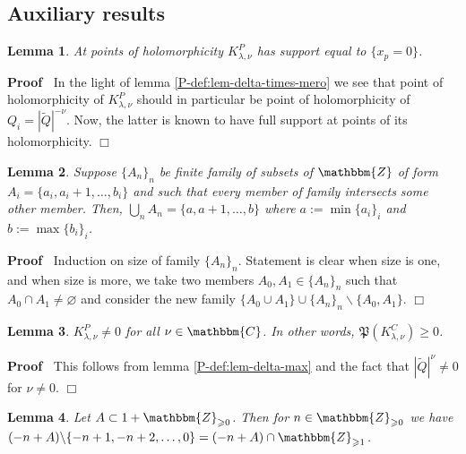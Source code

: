 \documentclass{article}
\newcommand{\assign}{:=}
\newenvironment{proof}{\noindent\textbf{Proof\ }}{\hspace*{\fill}$\Box$\medskip}
\numberwithin{definition}{section}
\newtheorem{lemma}{Lemma}
\numberwithin{lemma}{section}
\numberwithin{proposition}{section}
{\theorembodyfont{\rmfamily}\newtheorem{remark}{Remark}
\numberwithin{remark}{section}
}
\begin{document}
\subsection{Auxiliary results}

\begin{lemma}
  \label{KP-normalization-2:lem-holo-supp}At points of holomorphicity
  $K_{\lambda, \nu}^P$ has support equal to $\{ x_p = 0 \}$.
\end{lemma}

\begin{proof}
  In the light of lemma \ref{P-def:lem-delta-times-mero} we see that point of
  holomorphicity of $K_{\lambda, \nu}^P$ should in particular be point of
  holomorphicity of $Q_i = | \tilde{Q} |^{- \nu}$. Now, the latter is known to
  have full support at points of its holomorphicity.
\end{proof}

\begin{lemma}
  \label{KP-normalization-2:lem-sets}Suppose $\{ A_n \}_n$ be finite family of
  subsets of $\mathbbm{Z}$ of form $A_i = \{ a_i, a_i + 1, \ldots, b_i \}$ and
  such that every member of family intersects some other member. Then,
  $\bigcup_n A_n = \{ a, a + 1, \ldots, b \}$ where $a \assign \min \{ a_i
  \}_i$ and $b \assign \max \{ b_i \}_i$.
\end{lemma}

\begin{proof}
  Induction on size of family $\{ A_n \}_n$. Statement is clear when size is
  one, and when size is more, we take two members $A_0, A_1 \in \{ A_n \}_n$
  such that $A_0 \cap A_1 \neq \varnothing$ and consider the new family $\{
  A_0 \cup A_1 \} \cup \{ A_n \}_n \backslash \{ A_0, A_1 \}$.
\end{proof}

\begin{lemma}
  \label{KP-normalization-2:lem-nonzero}$K_{\lambda, \nu}^P \neq 0$ for all
  $\nu \in \mathbbm{C}$. In other words, $\mathfrak{P} ( K_{\lambda, \nu}^C)
  \geqslant 0$.
\end{lemma}

\begin{proof}
  This follows from lemma \ref{P-def:lem-delta-max} and the fact that $|
  \tilde{Q} |^{\nu} \neq 0$ for $\nu \neq 0$.
\end{proof}

\begin{lemma}
  \label{KP-normalization-2:lem-trivial}Let $A \subset 1
  +\mathbbm{Z}_{\geqslant 0}$. Then for $n \in \mathbbm{Z}_{\geqslant 0}$ we
  have $( - n + A) \backslash \{ - n + 1, - n + 2, \ldots, 0 \} = ( - n + A)
  \cap \mathbbm{Z}_{\geqslant 1}$.
\end{lemma}
\end{document}
